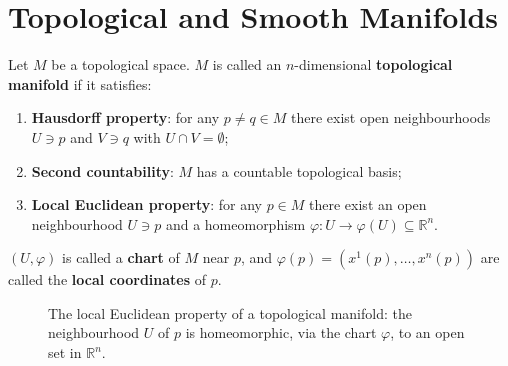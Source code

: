 \section{Topological and Smooth Manifolds}

\begin{definition}\label{def:topological_manifold}
Let $M$ be a topological space. $M$ is called an $n$-dimensional \textbf{topological manifold} if it satisfies:
\begin{enumerate}[label=(\roman*)]
    \item \textbf{Hausdorff property}: for any $p \neq q \in M$ there exist open neighbourhoods $U \ni p$ and $V \ni q$ with $U \cap V = \emptyset$;
    \item \textbf{Second countability}: $M$ has a countable topological basis;
    \item \textbf{Local Euclidean property}: for any $p \in M$ there exist an open neighbourhood $U \ni p$ and a homeomorphism $\varphi: U \to \varphi(U) \subseteq \mathbb{R}^n$.
\end{enumerate}
$(U, \varphi)$ is called a \textbf{chart} of $M$ near $p$, and $\varphi(p) = (x^1(p), \dots, x^n(p))$ are called the \textbf{local coordinates} of $p$.
\end{definition}

\begin{figure}[htbp]
\centering
{}
\caption{The local Euclidean property of a topological manifold: the neighbourhood $U$ of $p$ is homeomorphic, via the chart $\varphi$, to an open set in $\mathbb{R}^n$.}
\label{fig:topological_manifold_chart}
\end{figure}

